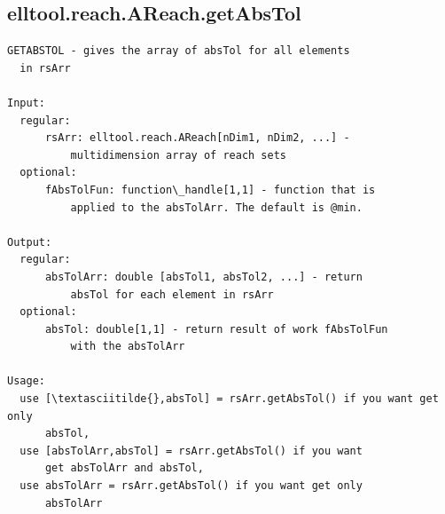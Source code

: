\documentclass[letterpaper,10pt,english]{sphinxmanual}
\begin{document}
\subsection{elltool.reach.AReach.getAbsTol}
\label{chap_functions:elltool-reach-areach-getabstol}
\begin{Verbatim}[commandchars=\\\{\}]
GETABSTOL - gives the array of absTol for all elements
  in rsArr

Input:
  regular:
      rsArr: elltool.reach.AReach[nDim1, nDim2, ...] -
          multidimension array of reach sets
  optional:
      fAbsTolFun: function\_handle[1,1] - function that is
          applied to the absTolArr. The default is @min.

Output:
  regular:
      absTolArr: double [absTol1, absTol2, ...] - return
          absTol for each element in rsArr
  optional:
      absTol: double[1,1] - return result of work fAbsTolFun
          with the absTolArr

Usage:
  use [\textasciitilde{},absTol] = rsArr.getAbsTol() if you want get only
      absTol,
  use [absTolArr,absTol] = rsArr.getAbsTol() if you want
      get absTolArr and absTol,
  use absTolArr = rsArr.getAbsTol() if you want get only
      absTolArr
\end{Verbatim}
\end{document}

